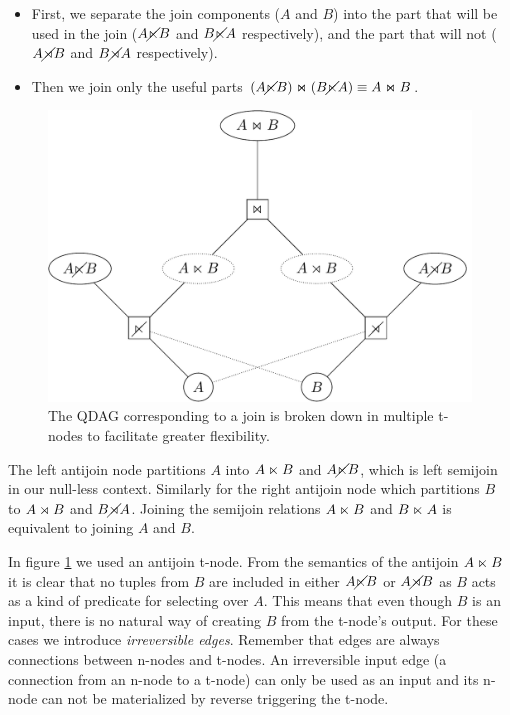 \begin{itemize}
\item First, we separate the join components (\(A\) and \(B\)) into the
  part that will be used in the join (\(A \cancel\ltimes B\) and \(B \cancel\ltimes A\)
  respectively), and the part that will not (\(A \cancel\rtimes B\) and
  \(B \cancel\rtimes A\) respectively).
\item Then we join only the useful parts
  \((A \cancel\ltimes B) \Join (B \cancel\ltimes A) \equiv A \Join B\).
\end{itemize}

\begin{figure}[p]
  \centering \includegraphics[width=.9\linewidth]{./imgs/joinnet.pdf}
  \caption{\label{fig:joinnet}The QDAG corresponding to a join is
    broken down in multiple t-nodes to facilitate greater
    flexibility.}
\end{figure}

The left antijoin node partitions \(A\) into \(A \ltimes B\) and
\(A \cancel\ltimes B\), which is left semijoin in our null-less
context. Similarly for the right antijoin node which partitions \(B\)
to \(A \rtimes B\) and \(B \cancel\rtimes A\). Joining the semijoin relations
\(A \ltimes B\) and \(B \ltimes A\) is equivalent to joining \(A\) and
\(B\).

In figure \ref{fig:joinnet} we used an antijoin t-node. From the
semantics of the antijoin \(A \ltimes B\) it is clear that no tuples
from \(B\) are included in either \(A \cancel\ltimes B\) or \(A \cancel\rtimes B\)
as \(B\) acts as a kind of predicate for selecting over \(A\). This
means that even though \(B\) is an input, there is no natural
way of creating \(B\) from the t-node's output. For these cases we
introduce \emph{irreversible edges}. Remember that edges are always connections
between n-nodes and t-nodes. An irreversible input edge (a connection
from an n-node to a t-node) can only be used as an input and its n-node
can not be materialized by reverse triggering the t-node.

